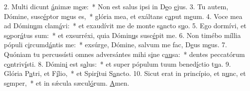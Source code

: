 2. Multi dicunt \uline{á}nimæ m\uline{e}æ:~* Non est salus ipsi in D\uline{e}o \uline{e}jus.
3. Tu autem, Dómine, susc\uline{é}ptor m\uline{e}us es,~* glória mea, et exáltans c\uline{a}put m\uline{e}um.
4. Voce mea ad Dómin\uline{u}m clam\uline{á}vi:~* et exaudívit me de monte s\uline{a}ncto s\uline{u}o.
5. Ego dormívi, et s\uline{o}por\uline{á}tus sum:~* et exsurréxi, quia Dómin\uline{u}s susc\uline{é}pit me.
6. Non timébo míllia pópuli c\uline{i}rcumd\uline{á}ntis me:~* exsúrge, Dómine, salvum me fac, D\uline{e}us m\uline{e}us.
7. Quóniam tu percussísti omnes adversántes mihi s\uline{i}ne c\uline{au}sa:~* dentes peccatórum c\uline{o}ntriv\uline{í}sti.
8. Dómin\uline{i} est s\uline{a}lus:~* et super pópulum tuum bened\uline{í}ctio t\uline{u}a.
9. Glória P\uline{a}tri, et F\uline{í}lio,~* et Spir\uline{í}tui S\uline{a}ncto.
10. Sicut erat in princípio, et n\uline{u}nc, et s\uline{e}mper,~* et in sǽcula sæcul\uline{ó}rum. \uline{A}men.
